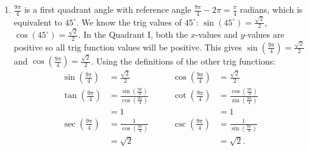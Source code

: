 \documentclass[nooutcomes]{ximera}
\begin{document}
\begin{exercise}
\begin{explanation}
\begin{enumerate}
			\item $\frac{9\pi}{4}$ is a first quadrant angle with reference angle $\frac{9\pi}{4} - 2\pi  = \frac{\pi}{4}$ radians, which is equivalent to $45^\circ$.
				We know the trig values of $45^\circ$: $\sin(45^\circ)= \frac{\sqrt{2}}{2}$, $\cos(45^\circ) = \frac{\sqrt{2}}{2}$.
				In the Quadrant I, both the $x$-values and $y$-values are positive so all trig function values will be positive.
				This gives
				$\sin\left( \frac{9\pi}{4} \right) = \frac{\sqrt{2}}{2}$ and $\cos\left( \frac{9\pi}{4}\right) = \frac{\sqrt{2}}{2}$. Using the definitions of the other trig
				 functions:
				$$
				  \begin{aligned}
				  \sin\left( \frac{9\pi}{4} \right) &= \frac{\sqrt{2}}{2}\\
				  \tan\left( \frac{9\pi}{4} \right) &= \frac{\sin\left( \frac{9\pi}{4} \right)}{\cos\left( \frac{9\pi}{4} \right)}\\
					&= 1\\
				  \sec\left( \frac{9\pi}{4} \right) &= \frac{1}{\cos\left( \frac{9\pi}{4} \right)}\\
				  	&= \sqrt{2}
				  \end{aligned}
				  \qquad
				  \begin{aligned}
				  \cos\left( \frac{9\pi}{4} \right) &= \frac{\sqrt{2}}{2}\\
				  \cot\left( \frac{9\pi}{4} \right) &= \frac{\cos\left( \frac{9\pi}{4} \right)}{\sin\left( \frac{9\pi}{4} \right)}\\
					&= 1\\
				  \csc\left( \frac{9\pi}{4} \right) &= \frac{1}{\sin\left( \frac{9\pi}{4} \right)}\\
				  	&= \sqrt{2}.    
				  \end{aligned}
				  $$
			

\end{enumerate}
\end{explanation}
\end{exercise}
\end{document}
